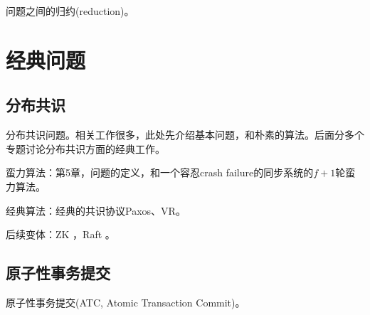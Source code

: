 问题之间的归约(reduction)。





\chapter{经典问题}

\section{分布共识}

分布共识问题。相关工作很多，此处先介绍基本问题，和朴素的算法。后面分多个专题讨论分布共识方面的经典工作。

\myleaf 蛮力算法：\cite{Attiya04}第5章，问题的定义，和一个容忍crash failure的同步系统的$f+1$轮蛮力算法。

\myleaf 经典算法：经典的共识协议Paxos\cite{Lamport01}、VR\cite{Oki88}。

\myleaf 后续变体：ZK \cite{Junqueira11}，Raft \cite{Ongaro14}。


\section{原子性事务提交}

原子性事务提交(ATC, Atomic Transaction Commit)。





